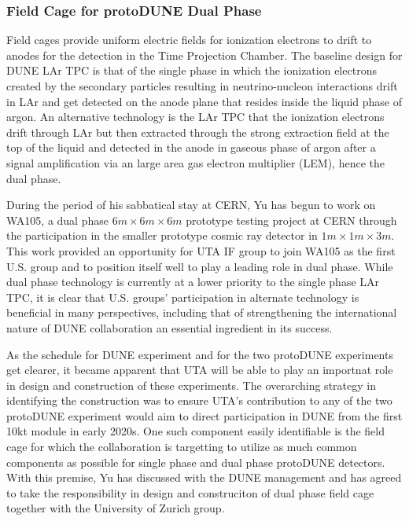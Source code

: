 \subsubsection{Field Cage for protoDUNE Dual Phase}
Field cages provide uniform electric fields for ionization electrons to drift to anodes for the detection in the Time Projection Chamber.
The baseline design for DUNE LAr TPC is that of the single phase in which the ionization electrons created by the secondary particles 
resulting in neutrino-nucleon interactions drift in LAr and get detected on the anode plane that resides inside the liquid phase of argon.  An alternative technology is the LAr TPC that the ionization electrons drift through LAr but then extracted through the strong extraction field at the top of the liquid and detected in the anode in gaseous phase of argon after a signal amplification via an large area gas electron multiplier (LEM), hence the dual phase.

During the period of his sabbatical stay at CERN, Yu has begun to work on WA105, a dual phase $6m\times 6m\times 6m$ prototype testing project at CERN through the participation in the smaller prototype cosmic ray detector in $1m\times 1m\times 3m$.  This work provided an opportunity for UTA IF group to join WA105 as the first U.S. group and to position itself well to play a leading role in dual phase.   While dual phase technology is currently at a lower priority to the single phase LAr TPC, it is clear that U.S. groups' participation in alternate technology is beneficial in many perspectives, including that of strengthening the international nature of DUNE collaboration an essential ingredient in its success.

As the schedule for DUNE experiment and for the two protoDUNE experiments get clearer, it became apparent that UTA will be able to play an importnat role in design and construction of these experiments.   The overarching strategy in identifying the construction was to ensure UTA's contribution to any of the two protoDUNE experiment would aim to direct participation in DUNE from the first 10kt module in early 2020s.  One such component easily identifiable is the field cage for which the collaboration is targetting to utilize as much common components as possible for single phase and dual phase protoDUNE detectors.    With this premise, Yu has discussed with the DUNE management and has agreed to take the responsibility in design and construciton of dual phase field cage together with the University of Zurich group.    

